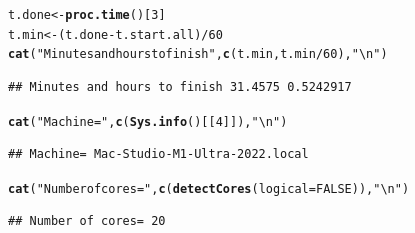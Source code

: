 \documentclass[9pt]{article}\usepackage[]{graphicx}\usepackage[]{xcolor}
\makeatletter
\newcommand{\hlnum}[1]{\textcolor[rgb]{0.686,0.059,0.569}{#1}}%
\newcommand{\hlstr}[1]{\textcolor[rgb]{0.192,0.494,0.8}{#1}}%
\newcommand{\hlopt}[1]{\textcolor[rgb]{0,0,0}{#1}}%
\newcommand{\hlstd}[1]{\textcolor[rgb]{0.345,0.345,0.345}{#1}}%
\newcommand{\hlkwb}[1]{\textcolor[rgb]{0.69,0.353,0.396}{#1}}%
\newcommand{\hlkwc}[1]{\textcolor[rgb]{0.333,0.667,0.333}{#1}}%
\newcommand{\hlkwd}[1]{\textcolor[rgb]{0.737,0.353,0.396}{\textbf{#1}}}%
\newenvironment{kframe}{%
 \def\at@end@of@kframe{}%
 \ifinner\ifhmode%
  \def\at@end@of@kframe{\end{minipage}}%
  \begin{minipage}{\columnwidth}%
 \fi\fi%
 \def\FrameCommand##1{\hskip\@totalleftmargin \hskip-\fboxsep
 \colorbox{shadecolor}{##1}\hskip-\fboxsep
     \hskip-\linewidth \hskip-\@totalleftmargin \hskip\columnwidth}%
 \MakeFramed {\advance\hsize-\width
   \@totalleftmargin\z@ \linewidth\hsize
   \@setminipage}}%
 {\par\unskip\endMakeFramed%
 \at@end@of@kframe}
\newenvironment{knitrout}{}{} %
\theoremstyle{definition}
\theoremstyle{remark}
\makeatother
\begin{document}
\begin{knitrout}
\color{fgcolor}\begin{kframe}
\begin{alltt}
\hlstd{t.done} \hlkwb{<-} \hlkwd{proc.time}\hlstd{()[}\hlnum{3}\hlstd{]}
\hlstd{t.min} \hlkwb{<-} \hlstd{(t.done} \hlopt{-} \hlstd{t.start.all)}\hlopt{/}\hlnum{60}
\hlkwd{cat}\hlstd{(}\hlstr{"Minutes and hours to finish"}\hlstd{,} \hlkwd{c}\hlstd{(t.min, t.min}\hlopt{/}\hlnum{60}\hlstd{),} \hlstr{"\textbackslash{}n"}\hlstd{)}
\end{alltt}
\begin{verbatim}
## Minutes and hours to finish 31.4575 0.5242917
\end{verbatim}
\begin{alltt}
\hlkwd{cat}\hlstd{(}\hlstr{"Machine="}\hlstd{,} \hlkwd{c}\hlstd{(}\hlkwd{Sys.info}\hlstd{()[[}\hlnum{4}\hlstd{]]),} \hlstr{"\textbackslash{}n"}\hlstd{)}
\end{alltt}
\begin{verbatim}
## Machine= Mac-Studio-M1-Ultra-2022.local
\end{verbatim}
\begin{alltt}
\hlkwd{cat}\hlstd{(}\hlstr{"Number of cores="}\hlstd{,} \hlkwd{c}\hlstd{(}\hlkwd{detectCores}\hlstd{(}\hlkwc{logical} \hlstd{=} \hlnum{FALSE}\hlstd{)),} \hlstr{"\textbackslash{}n"}\hlstd{)}
\end{alltt}
\begin{verbatim}
## Number of cores= 20
\end{verbatim}
\end{kframe}
\end{knitrout}
\end{document}
